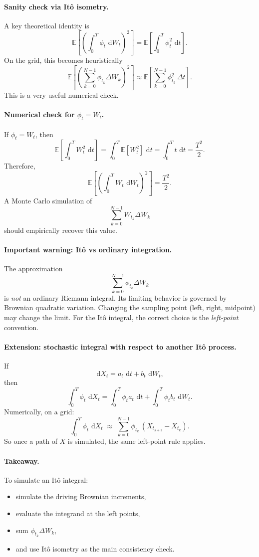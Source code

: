 \documentclass[11pt]{article}
\newcommand{\E}{\mathbb{E}}
\newcommand{\dd}{\,\mathrm{d}}
\newcommand{\1}{\mathbf{1}}
\theoremstyle{plain}
\theoremstyle{definition}
\theoremstyle{remark}
\begin{document}
\paragraph{Sanity check via It\^o isometry.}
A key theoretical identity is
\[
\E\!\left[\left(\int_0^T \phi_t\,\dd W_t\right)^2\right]
=
\E\!\left[\int_0^T \phi_t^2\,\dd t\right].
\]
On the grid, this becomes heuristically
\[
\E\!\left[\left(\sum_{k=0}^{N-1}\phi_{t_k}\Delta W_k\right)^2\right]
\approx
\E\!\left[\sum_{k=0}^{N-1}\phi_{t_k}^2\,\Delta t\right].
\]
This is a very useful numerical check.

\paragraph{Numerical check for \texorpdfstring{$\phi_t=W_t$}{phi = W}.}
If $\phi_t=W_t$, then
\[
\E\!\left[\int_0^T W_t^2\,\dd t\right]
=
\int_0^T \E[W_t^2]\,\dd t
=
\int_0^T t\,\dd t
=
\frac{T^2}{2}.
\]
Therefore,
\[
\E\!\left[\left(\int_0^T W_t\,\dd W_t\right)^2\right]
=
\frac{T^2}{2}.
\]
A Monte Carlo simulation of
\[
\sum_{k=0}^{N-1} W_{t_k}\Delta W_k
\]
should empirically recover this value.

\paragraph{Important warning: It\^o vs ordinary integration.}
The approximation
\[
\sum_{k=0}^{N-1} \phi_{t_k}\Delta W_k
\]
is \emph{not} an ordinary Riemann integral.
Its limiting behavior is governed by Brownian quadratic variation.
Changing the sampling point (left, right, midpoint) may change the limit.
For the It\^o integral, the correct choice is the \emph{left-point} convention.

\paragraph{Extension: stochastic integral with respect to another It\^o process.}
If
\[
\dd X_t = a_t\,\dd t + b_t\,\dd W_t,
\]
then
\[
\int_0^T \phi_t\,\dd X_t
=
\int_0^T \phi_t a_t\,\dd t
+
\int_0^T \phi_t b_t\,\dd W_t.
\]
Numerically, on a grid:
\[
\int_0^T \phi_t\,\dd X_t
\;\approx\;
\sum_{k=0}^{N-1}\phi_{t_k}\,(X_{t_{k+1}}-X_{t_k}).
\]
So once a path of \(X\) is simulated, the same left-point rule applies.

\paragraph{Takeaway.}
To simulate an It\^o integral:
\begin{itemize}[leftmargin=1.6em, itemsep=0.25em]
\item simulate the driving Brownian increments,
\item evaluate the integrand at the left points,
\item sum \(\phi_{t_k}\Delta W_k\),
\item and use It\^o isometry as the main consistency check.
\end{itemize}
\end{document}
